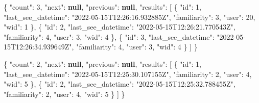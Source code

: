 \documentclass[
]{article}
\newenvironment{Shaded}{}{}
\newcommand{\DataTypeTok}[1]{\textcolor[rgb]{0.56,0.13,0.00}{#1}}
\newcommand{\DecValTok}[1]{\textcolor[rgb]{0.25,0.63,0.44}{#1}}
\newcommand{\FunctionTok}[1]{\textcolor[rgb]{0.02,0.16,0.49}{#1}}
\newcommand{\KeywordTok}[1]{\textcolor[rgb]{0.00,0.44,0.13}{\textbf{#1}}}
\newcommand{\OtherTok}[1]{\textcolor[rgb]{0.00,0.44,0.13}{#1}}
\newcommand{\StringTok}[1]{\textcolor[rgb]{0.25,0.44,0.63}{#1}}
\begin{document}
\begin{Shaded}
\begin{Highlighting}[]
\FunctionTok{\{}
  \DataTypeTok{"count"}\FunctionTok{:} \DecValTok{3}\FunctionTok{,}
  \DataTypeTok{"next"}\FunctionTok{:} \KeywordTok{null}\FunctionTok{,}
  \DataTypeTok{"previous"}\FunctionTok{:} \KeywordTok{null}\FunctionTok{,}
  \DataTypeTok{"results"}\FunctionTok{:} \OtherTok{[}
    \FunctionTok{\{}
      \DataTypeTok{"id"}\FunctionTok{:} \DecValTok{1}\FunctionTok{,}
      \DataTypeTok{"last\_see\_datetime"}\FunctionTok{:} \StringTok{"2022{-}05{-}15T12:26:16.932885Z"}\FunctionTok{,}
      \DataTypeTok{"familiarity"}\FunctionTok{:} \DecValTok{3}\FunctionTok{,}
      \DataTypeTok{"user"}\FunctionTok{:} \DecValTok{20}\FunctionTok{,}
      \DataTypeTok{"wid"}\FunctionTok{:} \DecValTok{1}
    \FunctionTok{\}}\OtherTok{,}
    \FunctionTok{\{}
      \DataTypeTok{"id"}\FunctionTok{:} \DecValTok{2}\FunctionTok{,}
      \DataTypeTok{"last\_see\_datetime"}\FunctionTok{:} \StringTok{"2022{-}05{-}15T12:26:21.770543Z"}\FunctionTok{,}
      \DataTypeTok{"familiarity"}\FunctionTok{:} \DecValTok{4}\FunctionTok{,}
      \DataTypeTok{"user"}\FunctionTok{:} \DecValTok{3}\FunctionTok{,}
      \DataTypeTok{"wid"}\FunctionTok{:} \DecValTok{4}
    \FunctionTok{\}}\OtherTok{,}
    \FunctionTok{\{}
      \DataTypeTok{"id"}\FunctionTok{:} \DecValTok{3}\FunctionTok{,}
      \DataTypeTok{"last\_see\_datetime"}\FunctionTok{:} \StringTok{"2022{-}05{-}15T12:26:34.939649Z"}\FunctionTok{,}
      \DataTypeTok{"familiarity"}\FunctionTok{:} \DecValTok{4}\FunctionTok{,}
      \DataTypeTok{"user"}\FunctionTok{:} \DecValTok{3}\FunctionTok{,}
      \DataTypeTok{"wid"}\FunctionTok{:} \DecValTok{4}
    \FunctionTok{\}}
  \OtherTok{]}
\FunctionTok{\}}
\end{Highlighting}
\end{Shaded}

\begin{Shaded}
\begin{Highlighting}[]
\FunctionTok{\{}
  \DataTypeTok{"count"}\FunctionTok{:} \DecValTok{2}\FunctionTok{,}
  \DataTypeTok{"next"}\FunctionTok{:} \KeywordTok{null}\FunctionTok{,}
  \DataTypeTok{"previous"}\FunctionTok{:} \KeywordTok{null}\FunctionTok{,}
  \DataTypeTok{"results"}\FunctionTok{:} \OtherTok{[}
    \FunctionTok{\{}
      \DataTypeTok{"id"}\FunctionTok{:} \DecValTok{1}\FunctionTok{,}
      \DataTypeTok{"last\_see\_datetime"}\FunctionTok{:} \StringTok{"2022{-}05{-}15T12:25:30.107155Z"}\FunctionTok{,}
      \DataTypeTok{"familiarity"}\FunctionTok{:} \DecValTok{2}\FunctionTok{,}
      \DataTypeTok{"user"}\FunctionTok{:} \DecValTok{4}\FunctionTok{,}
      \DataTypeTok{"wid"}\FunctionTok{:} \DecValTok{5}
    \FunctionTok{\}}\OtherTok{,}
    \FunctionTok{\{}
      \DataTypeTok{"id"}\FunctionTok{:} \DecValTok{2}\FunctionTok{,}
      \DataTypeTok{"last\_see\_datetime"}\FunctionTok{:} \StringTok{"2022{-}05{-}15T12:25:32.788455Z"}\FunctionTok{,}
      \DataTypeTok{"familiarity"}\FunctionTok{:} \DecValTok{2}\FunctionTok{,}
      \DataTypeTok{"user"}\FunctionTok{:} \DecValTok{4}\FunctionTok{,}
      \DataTypeTok{"wid"}\FunctionTok{:} \DecValTok{5}
    \FunctionTok{\}}
  \OtherTok{]}
\FunctionTok{\}}
\end{Highlighting}
\end{Shaded}
\end{document}
